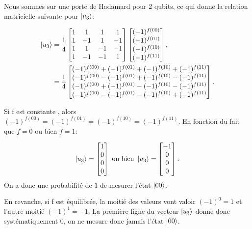Nous sommes sur une porte de Hadamard pour 2 qubits, ce qui donne
la relation matricielle suivante pour $\ket{u_3}$:

\begin{align}
\ket{u_3} &=
\frac{1}{4} 
\begin{bmatrix}
  1 & 1 & 1 & 1 \\
  1 & -1 & 1 & -1 \\
  1 & 1 & -1 & -1 \\
  1 & -1 & -1 & 1 \\
\end{bmatrix}
\begin{bmatrix}
  (-1)^{f(00)} \\ (-1)^{f(01)} \\ (-1)^{f(10)} \\ (-1)^{f(11)}
\end{bmatrix} , \nonumber \\ 
 &= \frac{1}{4} 
\begin{bmatrix}
  (-1)^{f(00)} + (-1)^{f(01)} + (-1)^{f(10)} + (-1)^{f(11)} \\
  (-1)^{f(00)} - (-1)^{f(01)} + (-1)^{f(10)} - (-1)^{f(11)} \\
  (-1)^{f(00)} + (-1)^{f(01)} - (-1)^{f(10)} - (-1)^{f(11)} \\
  (-1)^{f(00)} - (-1)^{f(01)} - (-1)^{f(10)} + (-1)^{f(11)} \\
\end{bmatrix}.
\end{align}

Si f est constante , alors
$(-1)^{f(00)} = (-1)^{f(01)} = (-1)^{f(10)} = (-1)^{f(11)}$. En
fonction du fait que $f=0$ ou bien $f=1$:

\begin{equation}
  \label{eq:6}
\ket{u_3}=
\begin{bmatrix}
  1 \\ 0 \\ 0 \\ 0
\end{bmatrix}  \text{ ou bien }
\ket{u_3}=
\begin{bmatrix}
  -1 \\ 0 \\ 0 \\ 0
\end{bmatrix}.
\end{equation}
On a donc une probabilité de $1$ de mesurer l'état $\ket{00}$.

En revanche, si f est équilibrée, la moitié des valeurs vont
valoir $(-1)^{0} = 1$ et l'autre moitié $(-1)^{1} = -1$. La première
ligne du vecteur $\ket{u_3}$ donne donc systématiquement 0, on ne mesure donc
jamais l'état $\ket{00}$.

